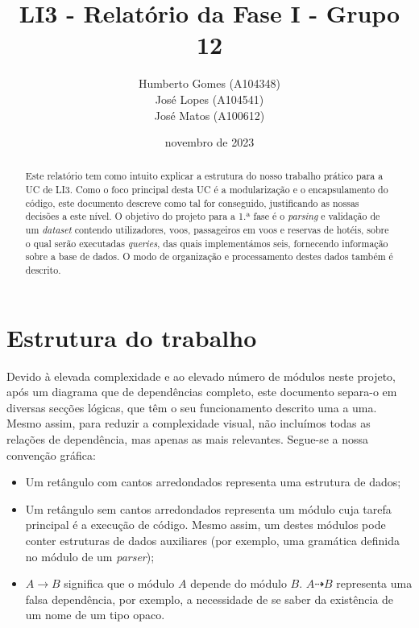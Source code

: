 \documentclass[12pt, a4paper]{article}
\title{\textbf{LI3 - Relatório da Fase I - Grupo 12}}
\author{
    Humberto Gomes (A104348) \\
    José Lopes     (A104541) \\
    José Matos     (A100612) \\
}
\date{novembro de 2023}
\begin{document}
\maketitle
\onehalfspacing
\setlength{\parskip}{\baselineskip}
\setlength{\parindent}{0pt}

\begin{abstract}
    Este relatório tem como intuito explicar a estrutura do nosso trabalho prático para a UC de LI3.
    Como o foco principal desta UC é a modularização e o encapsulamento do código, este documento
    descreve como tal for conseguido, justificando as nossas decisões a este nível. O objetivo do
    projeto para a 1.ª fase é o \emph{parsing} e validação de um \emph{dataset} contendo
    utilizadores, voos, passageiros em voos e reservas de hotéis, sobre o qual serão executadas
    \emph{queries}, das quais implementámos seis, fornecendo informação sobre a base de dados. O
    modo de organização e processamento destes dados também é descrito.
\end{abstract}

\section{Estrutura do trabalho}

Devido à elevada complexidade e ao elevado número de módulos neste projeto, após um diagrama que
de dependências completo, este documento separa-o em diversas secções lógicas, que têm o seu
funcionamento descrito uma a uma. Mesmo assim, para reduzir a complexidade visual, não incluímos
todas as relações de dependência, mas apenas as mais relevantes. Segue-se a nossa convenção gráfica:

\begin{itemize}
    \item Um retângulo com cantos arredondados representa uma estrutura de dados;
    \item Um retângulo sem cantos arredondados representa um módulo cuja tarefa principal é a
          execução de código. Mesmo assim, um destes módulos pode conter estruturas de dados
          auxiliares (por exemplo, uma gramática definida no módulo de um \emph{parser});
    \item $A \rightarrow B$ significa que o módulo $A$ depende do módulo $B$. $A \dashrightarrow B$
          representa uma falsa dependência, por exemplo, a necessidade de se saber da existência
          de um nome de um tipo opaco.
\end{itemize}
\end{document}
